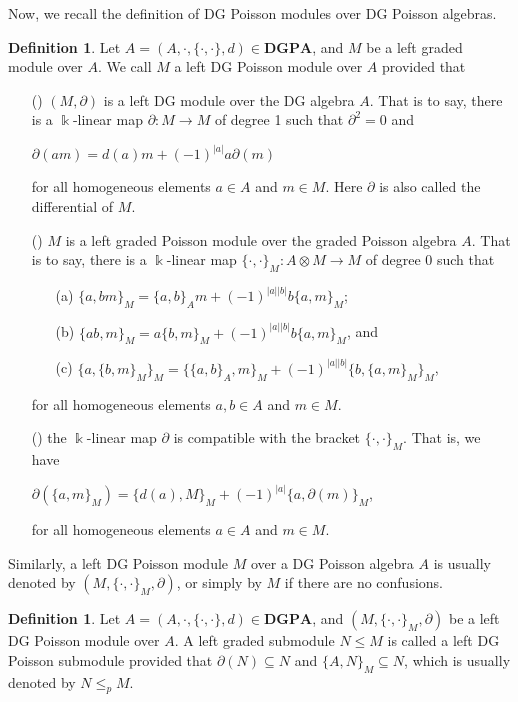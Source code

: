 \documentclass[a4paper,10pt]{amsart}
\theoremstyle{definition}
\newtheorem{defn}[theorem]{Definition}
\theoremstyle{remark}
\numberwithin{equation}{section}
\begin{document}
Now, we recall the definition of DG Poisson modules over DG Poisson algebras.
\begin{defn} \cite{LWZ}\label{defn1}
Let $A=(A, \cdot, \{\cdot, \cdot\}, d)\in \textbf{DGPA}$, and $M$ be a left
graded module over $A$. We call $M$ a left DG Poisson module over
$A$ provided that
\begin{enumerate}
\item[({\romannumeral {1}})] $(M, \partial)$ is a left DG module over the DG algebra $A$. That is to say, there is a $\Bbbk$-linear map $\partial: M\rightarrow M$ of degree 1 such that $\partial^2=0$ and
\begin{center}
$\partial(am)=d(a)m+(-1)^{|a|}a\partial(m)$
\end{center}
for all homogeneous elements $a\in A$ and $m\in M$. Here $\partial$ is also called the differential of $M$.

\item[({\romannumeral {2}})] $M$ is a left graded Poisson module over the graded Poisson algebra $A$. That is to say, there is a $\Bbbk$-linear map $\{\cdot, \cdot\}_M: A\otimes M\rightarrow M$ of degree 0 such that
\begin{enumerate}
  \item[({\romannumeral {1}}a)] $\{a, bm\}_M=\{a, b\}_Am+(-1)^{|a||b|}b\{a, m\}_M$;
  \item[({\romannumeral {1}}b)] $\{ab, m\}_M=a\{b, m\}_M+(-1)^{|a||b|}b\{a, m\}_M$, and
  \item[({\romannumeral {1}}c)] $\{a, \{b, m\}_M\}_M=\{\{a, b\}_A, m\}_M+(-1)^{|a||b|}\{b, \{a, m\}_M\}_M$,
\end{enumerate}
for all homogeneous elements $a, b\in A$ and $m\in M$.

\item[({\romannumeral {3}})] the $\Bbbk$-linear map $\partial$ is compatible with the bracket $\{\cdot, \cdot\}_M$. That is, we have
\begin{center}
$\partial(\{a, m\}_M)=\{d(a), M\}_M+(-1)^{|a|}\{a, \partial(m)\}_M$,
\end{center}
for all homogeneous elements $a\in A$ and $m\in M$.
\end{enumerate}
Similarly, a left DG Poisson module $M$ over a DG Poisson algebra $A$ is usually denoted by $(M, \{\cdot, \cdot\}_M, \partial)$, or simply by $M$ if there are no confusions.
\end{defn}
\begin{defn}
Let $A=(A, \cdot, \{\cdot, \cdot\}, d)\in \textbf{DGPA}$, and $(M, \{\cdot, \cdot\}_M,
\partial)$ be a left DG Poisson module over $A$. A left graded
submodule $N\leq M$ is called a left DG Poisson submodule provided
that $\partial(N)\subseteq N$ and $\{A, N\}_M\subseteq N$, which is
usually denoted by $N\leq_pM$.
\end{defn}
\end{document}
